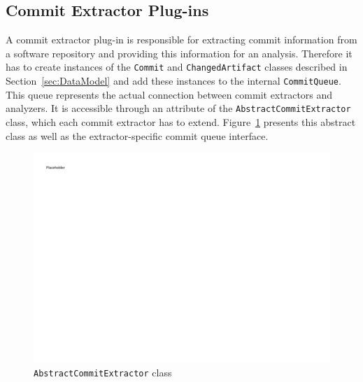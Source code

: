 \subsection{Commit Extractor Plug-ins}
\label{sec:CommitExtractorPlugins}
A commit extractor plug-in is responsible for extracting commit information from a software repository and providing this information for an analysis. Therefore it has to create instances of the \texttt{Commit} and \texttt{ChangedArtifact} classes described in Section~\ref{sec:DataModel} and add these instances to the internal \texttt{CommitQueue}. This queue represents the actual connection between commit extractors and analyzers. It is accessible through an attribute of the \texttt{AbstractCommitExtractor} class, which each commit extractor has to extend. Figure~\ref{fig:AbstractCommitExtractorClass} presents this abstract class as well as the extractor-specific commit queue interface.

\begin{figure}[ht] %
	\centering
		\includegraphics[width=\columnwidth,trim={1,7cm 20,4cm 6,9cm 3,1cm},clip]{inserts/abstract_commit_extractor.pdf}
  \caption{\thetool{} \texttt{AbstractCommitExtractor} class}
	\label{fig:AbstractCommitExtractorClass}
\end{figure}


